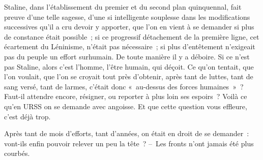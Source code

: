 \documentclass[french,twoside]{book} %
\newcommand{\astermono}{\medskip\centerline{\color{rubric}\large\selectfont{\syms ✻}}\medskip\par}%
\begin{document}
\astermono

\noindent Staline, dans l’établissement du premier et du second plan quinquennal, fait preuve d’une telle sagesse, d’une si intelligente souplesse dans les modifications successives qu’il a cru devoir y apporter, que l’on en vient à se demander si plus de constance était possible ; si ce progressif détachement de la première ligne, cet écartement du Léninisme, n’était pas nécessaire ; si plus d’entêtement n’exigeait pas du peuple un effort surhumain. De toute manière il y a déboire. Si ce n’est pas Staline, alors c’est l’homme, l’être humain, qui déçoit. Ce qu’on tentait, que l’on voulait, que l’on se croyait tout près d’obtenir, après tant de luttes, tant de sang versé, tant de larmes, c’était donc « au-dessus des forces humaines » ? Faut-il attendre encore, résigner, ou reporter à plus loin ses espoirs ? Voilà ce qu’en URSS on se demande avec angoisse. Et que cette question vous effleure, c’est déjà trop.\par
Après tant de mois d’efforts, tant d’années, on était en droit de se demander : vont-ils enfin pouvoir relever un peu la tête ? – Les fronts n’ont jamais été plus courbés.\par

\astermono
\end{document}
